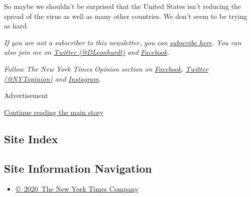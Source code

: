 So maybe we shouldn't be surprised that the United States isn't reducing
the spread of the virus as well as many other countries. We don't seem
to be trying as hard.

\emph{If you are not a subscriber to this newsletter, you can}
\href{https://www.nytimes3xbfgragh.onion/newsletters/david-leonhardt}{\emph{subscribe
here}}\emph{. You can also join me on}
\href{https://twitter.com/DLeonhardt}{\emph{Twitter (@DLeonhardt)}}
\emph{and}
\href{https://www.facebookcorewwwi.onion/DavidRLeonhardt/}{\emph{Facebook}}\emph{.}

\emph{Follow The New York Times Opinion section on}
\href{https://www.facebookcorewwwi.onion/nytopinion}{\emph{Facebook}}\emph{,}
\href{http://twitter.com/NYTOpinion}{\emph{Twitter (@NYTopinion)}}
\emph{and}
\href{https://www.instagram.com/nytopinion/}{\emph{Instagram}}\emph{.}

Advertisement

\protect\hyperlink{after-bottom}{Continue reading the main story}

\hypertarget{site-index}{%
\subsection{Site Index}\label{site-index}}

\hypertarget{site-information-navigation}{%
\subsection{Site Information
Navigation}\label{site-information-navigation}}

\begin{itemize}
\tightlist
\item
  \href{https://help.nytimes3xbfgragh.onion/hc/en-us/articles/115014792127-Copyright-notice}{©~2020~The
  New York Times Company}
\end{itemize}

